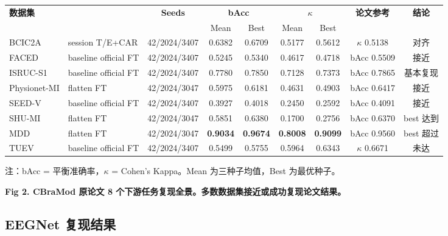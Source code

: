 \documentclass[12pt, a0paper]{article}
\renewcommand{\small}{\fontsize{18}{24}\selectfont}
\renewcommand{\footnotesize}{\fontsize{15}{20}\selectfont}
\newcommand{\figcaption}[1]{%
    \vspace{0.3em}
    {\color{myblue}\bfseries #1}
    \vspace{0.2em}
}
\begin{document}
\begin{multicols}{2}
{\footnotesize
\begin{center}
\begin{tabularx}{\columnwidth}{l>{\raggedright\arraybackslash}p{3.5cm}ccccccc}
\toprule
\multirow{2}{*}{\textbf{数据集}} & \multirow{2}{*}{\textbf{版本配置}} & \multirow{2}{*}{\textbf{Seeds}} &
\multicolumn{2}{c}{\textbf{bAcc}} & \multicolumn{2}{c}{\textbf{\(\kappa\)}} &
\multirow{2}{*}{\textbf{论文参考}} & \multirow{2}{*}{\textbf{结论}} \\
\cmidrule(lr){4-5} \cmidrule(lr){6-7}
& & & Mean & Best & Mean & Best & & \\
\midrule
BCIC2A & session T/E+CAR & 42/2024/3407 & 0.6382 & 0.6709 & 0.5177 & 0.5612 & \(\kappa\) 0.5138 & \cellcolor{mygreen!15}对齐 \\
FACED & baseline official FT & 42/2024/3407 & 0.5245 & 0.5340 & 0.4617 & 0.4718 & bAcc 0.5509 & 接近 \\
ISRUC-S1 & baseline official FT & 42/2024/3407 & 0.7780 & 0.7850 & 0.7128 & 0.7373 & bAcc 0.7865 & \cellcolor{mygreen!15}基本复现 \\
Physionet-MI & flatten FT & 42/2024/3047 & 0.5975 & 0.6181 & 0.4631 & 0.4903 & bAcc 0.6417 & 接近 \\
SEED-V & baseline official FT & 42/2024/3407 & 0.3927 & 0.4018 & 0.2450 & 0.2592 & bAcc 0.4091 & 接近 \\
SHU-MI & flatten FT & 42/2024/3047 & 0.5851 & 0.6380 & 0.1700 & 0.2756 & bAcc 0.6370 & \cellcolor{mygreen!15}best 达到 \\
MDD & flatten FT & 42/2024/3047 & \textbf{0.9034} & \textbf{0.9674} & \textbf{0.8008} & \textbf{0.9099} & bAcc 0.9560 & \cellcolor{mygreen!15}best 超过 \\
TUEV & baseline official FT & 42/2024/3407 & 0.5499 & 0.5755 & 0.5964 & 0.6343 & \(\kappa\) 0.6671 & 未达 \\
\bottomrule
\end{tabularx}
\end{center}
\vspace{0.2em}
{\small\color{mygray}注：bAcc = 平衡准确率，\(\kappa\) = Cohen's Kappa。Mean 为三种子均值，Best 为最优种子。}
}

\figcaption{Fig 2. CBraMod 原论文 8 个下游任务复现全景。多数数据集接近或成功复现论文结果。}

\vspace{1em}

\subsection{EEGNet 复现结果}


\end{multicols}
\end{document}
